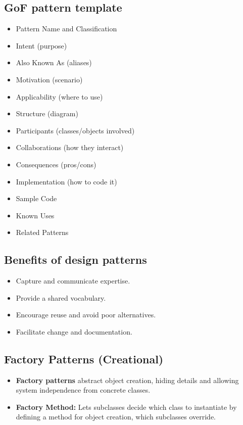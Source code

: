 \documentclass[11pt,a4paper]{article}
\begin{document}
\subsection*{GoF pattern template}
\begin{itemize}
    \item Pattern Name and Classification
    \item Intent (purpose)
    \item Also Known As (aliases)
    \item Motivation (scenario)
    \item Applicability (where to use)
    \item Structure (diagram)
    \item Participants (classes/objects involved)
    \item Collaborations (how they interact)
    \item Consequences (pros/cons)
    \item Implementation (how to code it)
    \item Sample Code
    \item Known Uses
    \item Related Patterns
\end{itemize}

\subsection*{Benefits of design patterns}
\begin{itemize}
    \item Capture and communicate expertise.
    \item Provide a shared vocabulary.
    \item Encourage reuse and avoid poor alternatives.
    \item Facilitate change and documentation.
\end{itemize}

\subsection*{Factory Patterns (Creational)}
\begin{itemize}
    \item \textbf{Factory patterns} abstract object creation, hiding details and allowing system independence from concrete classes.
    \item \textbf{Factory Method:} Lets subclasses decide which class to instantiate by defining a method for object creation, which subclasses override.
\end{itemize}
\end{document}
